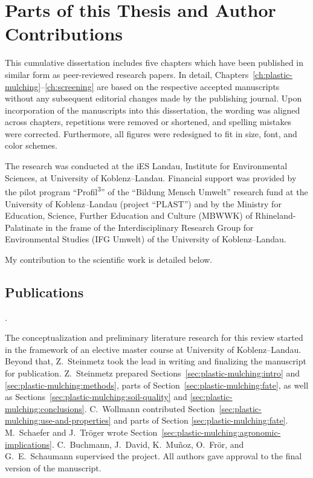 
\chapter{Parts of this Thesis and Author Contributions}
\label{ch:author-contributions}

This cumulative dissertation includes five chapters which have been published in similar form as peer-reviewed research papers.
In detail, Chapters~\ref{ch:plastic-mulching}--\ref{ch:screening} are based on the respective accepted manuscripts without any subsequent editorial changes made by the publishing journal.
Upon incorporation of the manuscripts into this dissertation, the wording was aligned across chapters, repetitions were removed or shortened, and spelling mistakes were corrected. Furthermore, all figures were redesigned to fit in size, font, and color schemes.

The research was conducted at the iES Landau, Institute for Environmental Sciences, at University of Koblenz--Landau. Financial support was provided by the pilot program ``Profil\textsuperscript{3}'' of the ``\foreignlanguage{ngerman}{Bildung Mensch Umwelt}'' research fund at the University of Koblenz--Landau (project ``PLAST'') and by the Ministry for Education, Science, Further Education and Culture (MBWWK) of Rhineland-Palatinate in the frame of the Interdisciplinary Research Group for Environmental Studies (\foreignlanguage{ngerman}{IFG Umwelt}) of the University of Koblenz--Landau.

My contribution to the scientific work is detailed below.

\section*{Publications}

\vspace{0.5\baselineskip}
\noindent{}.

\begin{description}
	\setlength\itemsep{0em}
	\item[Author contributions:] The conceptualization and preliminary literature research for this review started in the framework of an elective master course at University of Koblenz--Landau. Beyond that, Z.~Steinmetz took the lead in writing and finalizing the manuscript for publication. Z.~Steinmetz prepared Sections~\ref{sec:plastic-mulching:intro} and \ref{sec:plastic-mulching:methods}, parts of Section~\ref{sec:plastic-mulching:fate}, as well as Sections~\ref{sec:plastic-mulching:soil-quality} and \ref{sec:plastic-mulching:conclusions}. C.~Wollmann contributed Section~\ref{sec:plastic-mulching:use-and-properties} and parts of Section \ref{sec:plastic-mulching:fate}. M.~Schaefer and J.~Tröger wrote Section~\ref{sec:plastic-mulching:agronomic-implications}. C.~Buchmann, J.~David, K.~Muñoz, O.~Frör, and G.~E.~Schaumann supervised the project. All authors gave approval to the final version of the manuscript.
\end{description}

